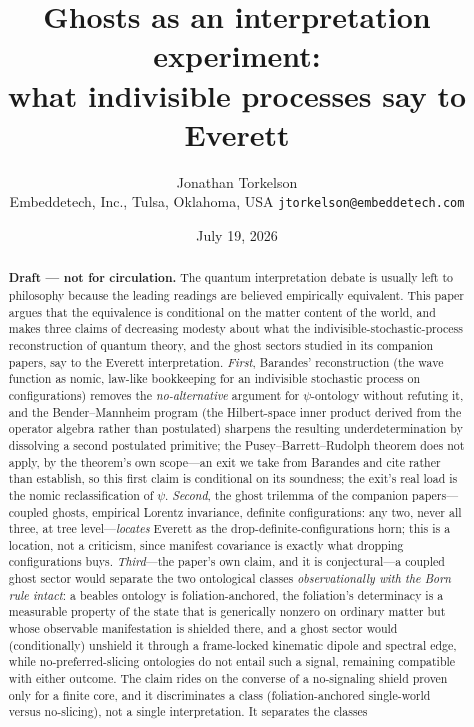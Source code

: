 \documentclass[11pt]{article}
\title{Ghosts as an interpretation experiment:\\
what indivisible processes say to Everett}
\author{Jonathan Torkelson\\[2pt]
\small Embeddetech, Inc., Tulsa, Oklahoma, USA \quad
\texttt{jtorkelson@embeddetech.com}}
\date{July 19, 2026}
\theoremstyle{remark}
\begin{document}
\maketitle

\begin{abstract}
\noindent\textbf{Draft --- not for circulation.}
The quantum interpretation debate is usually left to philosophy because
the leading readings are believed empirically equivalent. This paper
argues that the equivalence is conditional on the matter content of the
world, and makes three claims of decreasing modesty about what the
indivisible-stochastic-process reconstruction of quantum theory, and
the ghost sectors studied in its companion papers, say to the Everett
interpretation. \emph{First}, Barandes' reconstruction (the wave
function as nomic, law-like bookkeeping for an indivisible stochastic
process on configurations) removes the \emph{no-alternative} argument
for $\psi$-ontology without refuting it, and the Bender--Mannheim
program (the
Hilbert-space inner product derived from the operator algebra rather
than postulated) sharpens the resulting underdetermination by
dissolving a second postulated primitive; the Pusey--Barrett--Rudolph
theorem does not apply, by the theorem's own scope---an exit we take
from Barandes and cite rather than establish, so this first claim is
conditional on its soundness; the exit's real load is the nomic
reclassification of $\psi$. \emph{Second}, the
ghost trilemma of the companion papers---coupled ghosts, empirical
Lorentz invariance, definite configurations: any two, never all three,
at tree level---\emph{locates} Everett as the
drop-definite-configurations horn; this is a location, not a
criticism, since manifest covariance is exactly what dropping
configurations buys. \emph{Third}---the paper's own claim, and it is
conjectural---a coupled ghost sector would separate the two ontological classes
\emph{observationally with the Born rule intact}: a beables ontology
is foliation-anchored, the foliation's determinacy is a measurable
property of the state that is generically nonzero on
ordinary matter
but whose observable manifestation is shielded there, and a ghost
sector would (conditionally) unshield it through a frame-locked
kinematic dipole and spectral edge, while no-preferred-slicing
ontologies do not entail such a signal, remaining compatible with either
outcome. The claim rides on the converse of a
no-signaling shield proven only for a finite core, and it
discriminates a class (foliation-anchored single-world versus
no-slicing), not a single interpretation. It separates the classes

\end{abstract}
\end{document}
